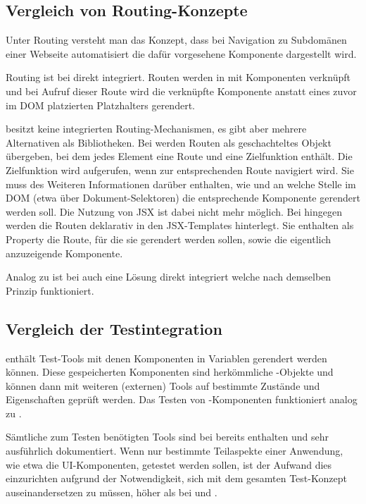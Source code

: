 \subsection{Vergleich von Routing-Konzepte}
Unter Routing versteht man das Konzept, dass bei Navigation zu Subdomänen einer Webseite automatisiert die dafür vorgesehene Komponente dargestellt wird.

Routing ist bei  direkt integriert. Routen werden in  mit Komponenten verknüpft und bei Aufruf dieser Route wird die verknüpfte Komponente anstatt eines zuvor im DOM platzierten Platzhalters gerendert.

 besitzt keine integrierten Routing-Mechanismen, es gibt aber mehrere Alternativen als Bibliotheken. Bei  werden Routen als geschachteltes Objekt übergeben, bei dem jedes Element eine Route und eine Zielfunktion enthält. Die Zielfunktion wird aufgerufen, wenn zur entsprechenden Route navigiert wird. Sie muss des Weiteren Informationen darüber enthalten, wie und an welche Stelle im DOM (etwa über Dokument-Selektoren) die entsprechende Komponente gerendert werden soll. Die Nutzung von JSX ist dabei nicht mehr möglich. Bei  hingegen werden die Routen deklarativ in den JSX-Templates hinterlegt. Sie enthalten als Property die Route, für die sie gerendert werden sollen, sowie die eigentlich anzuzeigende Komponente.

Analog zu  ist bei  auch eine Lösung direkt integriert welche nach demselben Prinzip funktioniert.

\subsection{Vergleich der Testintegration}
 enthält Test-Tools mit denen Komponenten in Variablen gerendert werden können. Diese gespeicherten Komponenten sind herkömmliche -Objekte und können dann mit weiteren (externen) Tools auf bestimmte Zustände und Eigenschaften geprüft werden. Das Testen von -Komponenten funktioniert analog zu .

Sämtliche zum Testen benötigten Tools sind bei  bereits enthalten und sehr ausführlich dokumentiert. Wenn nur bestimmte Teilaspekte einer Anwendung, wie etwa die UI-Komponenten, getestet werden sollen, ist der Aufwand dies einzurichten aufgrund der Notwendigkeit, sich mit dem gesamten Test-Konzept auseinandersetzen zu müssen, höher als bei  und .

